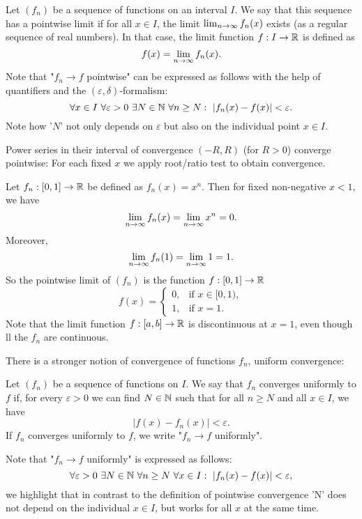 \documentclass[10pt, a4paper]{article}
\begin{document}
\begin{definition}
    Let $(f_n)$ be a sequence of functions on an interval $I$.
    We say that this sequence has a pointwise limit if for all $x \in I$,
    the limit $\lim_{n \rightarrow \infty} f_n(x)$ exists
    (as a regular sequence of real numbers).
    In that case,
    the limit function $f : I \rightarrow \mathbb{R}$ is defined as
    \[
    f(x) = \lim_{n \rightarrow \infty} f_n(x).
    \]
    Note that "$f_n \rightarrow f$ pointwise" can be expressed as follows with the help of quantifiers and the $(\varepsilon, \delta)$-formalism:
    \[
    \forall x \in I\ \forall \varepsilon > 0\ \exists N \in \mathbb{N}\ \forall n \geq N:\ |f_n(x) -f(x)| < \varepsilon.
    \]
    Note how '$N$' not only depends on $\varepsilon$ but also on the individual point $x \in I$.
\end{definition}

\begin{example}
    Power series in their interval of convergence $(-R, R)$
    (for $R > 0$)
    converge pointwise:
    For each fixed $x$ we apply root/ratio test to obtain convergence.
\end{example}

\begin{example}
    Let $f_n : [0, 1] \rightarrow \mathbb{R}$ be defined as $f_n(x) = x ^ n$.
    Then for fixed non-negative $x < 1$,
    we have
    \[
    \lim_{n \rightarrow \infty} f_n(x) = \lim_{n \rightarrow \infty} x ^ n = 0. 
    \]
    Moreover,
    \[
    \lim_{n \rightarrow \infty} f_n(1) = \lim_{n \rightarrow \infty} 1 = 1.
    \]
    So the pointwise limit of $(f_n)$ is the function $f : [0, 1] \rightarrow \mathbb{R}$
    \[
    f(x) = \begin{cases}
        0, & \text{if } x \in [0, 1), \\
        1, & \text{if } x = 1.
    \end{cases}
    \]
    Note that the limit function $f : [a, b] \rightarrow \mathbb{R}$ is discontinuous at $x = 1$,
    even though ll the $f_n$ are continuous.
\end{example}

There is a stronger notion of convergence of functions $f_n$,
uniform convergence:
\begin{definition}
    Let $(f_n)$ be a sequence of functions on $I$.
    We say that $f_n$ converges uniformly to $f$ if,
    for every $\varepsilon > 0$ we can find $N \in \mathbb{N}$ such that for all $n \geq N$ and all $x \in I$,
    we have
    \[
    |f(x) - f_n(x)| < \varepsilon.
    \]
    If $f_n$ converges uniformly to $f$,
    we write "$f_n \rightarrow f$ uniformly".

    Note that "$f_n \rightarrow f$ uniformly" is expressed as follows:
    \[
    \forall \varepsilon > 0\ \exists N \in \mathbb{N}\ \forall n \geq N\ \forall x \in I:\ |f_n(x) - f(x)| < \varepsilon,
    \]
    we highlight that in contrast to the definition of pointwise convergence 'N' does not depend on the individual $x \in I$,
    but works for all $x$ at the same time.
\end{definition}
\end{document}
